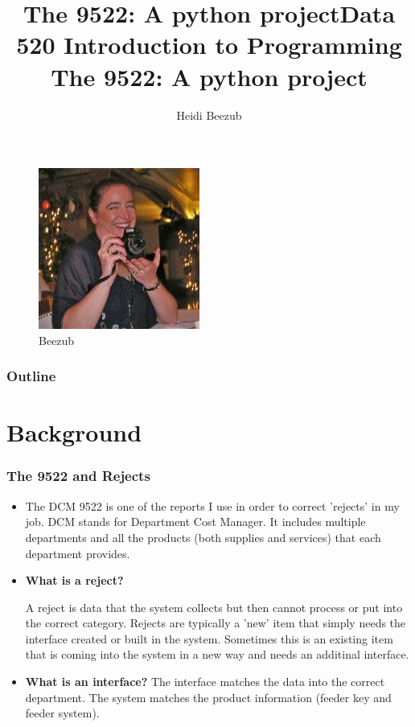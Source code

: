 \documentclass{beamer}\usepackage[]{graphicx}\usepackage[]{color}
\begin{document}
\title{The 9522: A python project}
\title{Data 520 Introduction to Programming \\
The 9522: A python project}
\author{Heidi Beezub}

\begin{frame}
  \titlepage
\begin{figure}
\includegraphics[scale=0.5]{profilePic}
\caption{Beezub}
\end{figure}
\end{frame}

\begin{frame}
  \frametitle{Outline}
    \tableofcontents
\end{frame}


\section{Background}
\begin{frame}[fragile]
  \frametitle{The 9522 and Rejects}
      \begin{itemize}
      \item<1->
        The DCM 9522 is one of the reports I use in order to correct 'rejects' in my job.  DCM stands for Department Cost Manager.  It includes multiple departments and all the products (both supplies and services) that each department provides.

      \item<2->
\textbf{What is a reject?}

   A reject is data that the system collects but then cannot process or put into the correct category.  Rejects are typically a 'new' item that simply needs the interface created or built in the system.  Sometimes this is an existing item that is coming into the system in a new way and needs an additinal interface.
    \item<3->
\textbf{What is an interface?}
The interface matches the data into the correct department. The system matches the product information (feeder key and feeder system).  

    \end{itemize}
  


\end{frame}
\end{document}
